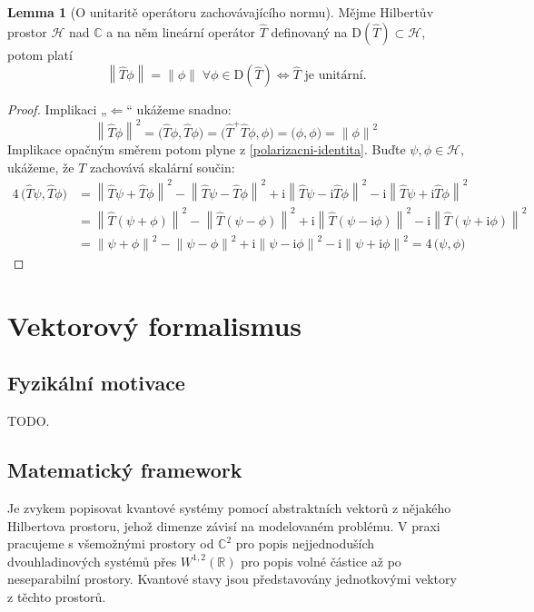 \documentclass[10pt,a4paper]{article}
\theoremstyle{definition}
\newtheorem{lemma}[theorem]{Lemma}
\newcommand{\const}[1]{\mathrm{#1}}
\newcommand{\norm}[1]{\left\lVert#1\right\rVert}
\newcommand{\innerprod}[2]{\big( #1, #2 \big)}
\renewcommand{\i}{\const{i}}
\def\R{\mathbb{R}}
\def\C{\mathbb{C}}
\def\H{\mathcal{H}}
\begin{document}
\begin{lemma}[O unitaritě operátoru zachovávajícího normu]
    \label{unitarni-zachova-normu}
    Mějme Hilbertův prostor $\H$ nad $\C$ a na něm lineární operátor $\hat T$ definovaný na $\mathrm{D}(\hat T) \subset \H$, potom platí
    \begin{equation*}
        \norm{\hat T \phi} = \norm{\phi}
        \;\forall \phi \in \mathrm{D}(\hat T)
        \iff
        \hat T \text{ je unitární.}
    \end{equation*}
\end{lemma}
\begin{proof}
    Implikaci „$\Leftarrow$“ ukážeme snadno:
    \begin{equation*}
        \norm{\hat T \phi}^2
        = \innerprod{\hat T \phi}{\hat T \phi}
        = \innerprod{\hat T^+ \hat T \phi}{\phi}
        = \innerprod{\phi}{\phi}
        = \norm{\phi}^2
    \end{equation*}
    Implikace opačným směrem potom plyne z \ref{polarizacni-identita}. Buďte $\psi, \phi \in \H$, ukážeme, že $T$ zachovává skalární součin:
    \begin{align*}
        4 \, \innerprod{\hat T \psi}{\hat T \phi}
        &= \norm{\hat T \psi + \hat T \phi}^2
        - \norm{\hat T \psi - \hat T \phi}^2
        + \i \norm{\hat T \psi - \i \hat T \phi}^2
        - \i \norm{\hat T \psi + \i \hat T \phi}^2
        \\[10pt]
        &= \norm{\hat T(\psi + \phi)}^2
        - \norm{\hat T(\psi - \phi)}^2
        + \i \norm{\hat T(\psi - \i \phi)}^2
        - \i \norm{\hat T(\psi + \i \phi)}^2
        \\[10pt]
        &= \norm{\psi + \phi}^2
        - \norm{\psi - \phi}^2
        + \i \norm{\psi - \i \phi}^2
        - \i \norm{\psi + \i \phi}^2
        = 4 \, \innerprod{\psi}{\phi}
    \end{align*}
\end{proof}


\section{Vektorový formalismus}

\subsection{Fyzikální motivace}
TODO.

\subsection{Matematický framework}
Je zvykem popisovat kvantové systémy pomocí abstraktních vektorů z nějakého Hilbertova prostoru, jehož dimenze závisí na modelovaném problému. V praxi pracujeme s všemožnými prostory od $\C^2$ pro popis nejjednoduších dvouhladinových systémů přes $W^{1,2}(\R)$ pro popis volné částice až po neseparabilní prostory. Kvantové stavy jsou představovány jednotkovými vektory z těchto prostorů.
\end{document}
